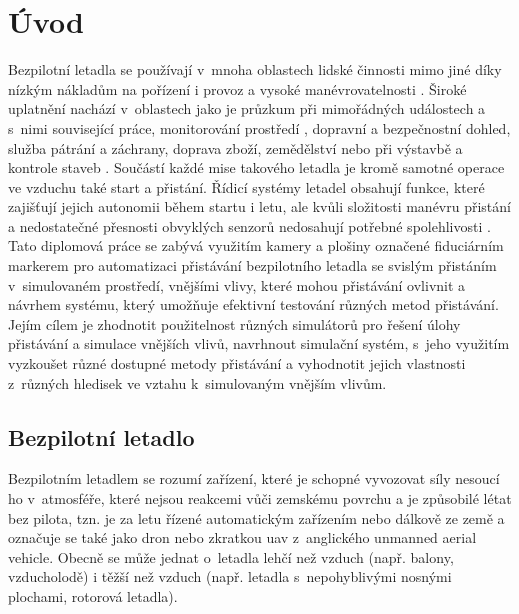 \chapter{Úvod} \label{chap:introduction}




Bezpilotní letadla se používají v~mnoha oblastech lidské činnosti mimo jiné díky nízkým nákladům na pořízení i provoz a vysoké manévrovatelnosti \cite{Hayat2016}. Široké uplatnění nachází v~oblastech jako je průzkum při mimořádných událostech a s~nimi související práce, monitorování prostředí \cite{Xin2022}, dopravní a bezpečnostní dohled, služba pátrání a záchrany, doprava zboží, zemědělství nebo při výstavbě a kontrole staveb \cite{Shakhatreh2019}. Součástí každé mise takového letadla je kromě samotné operace ve vzduchu také start a přistání. Řídicí systémy letadel obsahují funkce, které zajišťují jejich autonomii během startu i letu, ale kvůli složitosti manévru přistání a nedostatečné přesnosti obvyklých senzorů nedosahují potřebné spolehlivosti \cite{icuas}. Tato diplomová práce se zabývá využitím kamery a plošiny označené fiduciárním markerem pro automatizaci přistávání bezpilotního letadla se svislým přistáním v~simulovaném prostředí, vnějšími vlivy, které mohou přistávání ovlivnit a návrhem systému, který umožňuje efektivní testování různých metod přistávání. Jejím cílem je zhodnotit použitelnost různých simulátorů pro řešení úlohy přistávání a simulace vnějších vlivů, navrhnout simulační systém, s~jeho využitím vyzkoušet různé dostupné metody přistávání a vyhodnotit jejich vlastnosti z~různých hledisek ve vztahu k~simulovaným vnějším vlivům.

\section{Bezpilotní letadlo}
Bezpilotním letadlem se rozumí zařízení, které je schopné vyvozovat síly nesoucí ho v~atmosféře, které nejsou reakcemi vůči zemskému povrchu a je způsobilé létat bez pilota, tzn. je za letu řízené automatickým zařízením nebo dálkově ze země a označuje se také jako dron nebo zkratkou \acrshort{uav} z~anglického unmanned aerial vehicle. Obecně se může jednat o~letadla lehčí než vzduch (např. balony, vzducholodě) i těžší než vzduch (např. letadla s~nepohyblivými nosnými plochami, rotorová letadla). \cite{csn310001} 

